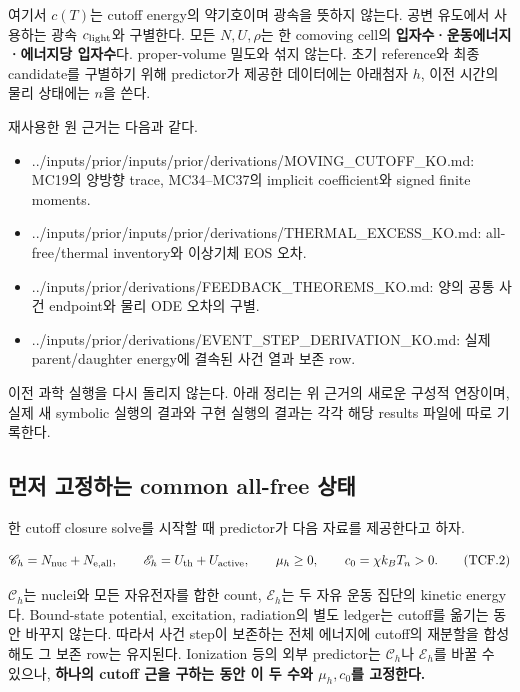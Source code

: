 \documentclass[11pt,a4paper]{article}
\providecommand{\tightlist}{\setlength{\itemsep}{2pt}\setlength{\parskip}{0pt}}
\begin{document}
여기서 \(c(T)\)는 cutoff energy의 약기호이며 광속을 뜻하지 않는다. 공변 유도에서 사용하는 광속 \(c_{\rm light}\)와 구별한다. 모든 \(N,U,\rho\)는 한 comoving cell의 \textbf{입자수·운동에너지·에너지당 입자수}다. proper-volume 밀도와 섞지 않는다. 초기 reference와 최종 candidate를 구별하기 위해 predictor가 제공한 데이터에는 아래첨자 \(h\), 이전 시간의 물리 상태에는 \(n\)을 쓴다.

재사용한 원 근거는 다음과 같다.

\begin{itemize}
\tightlist
\item
  ../inputs/prior/inputs/prior/derivations/MOVING\_CUTOFF\_KO.md: MC19의 양방향 trace, MC34--MC37의 implicit coefficient와 signed finite moments.
\item
  ../inputs/prior/inputs/prior/derivations/THERMAL\_EXCESS\_KO.md: all-free/thermal inventory와 이상기체 EOS 오차.
\item
  ../inputs/prior/derivations/FEEDBACK\_THEOREMS\_KO.md: 양의 공통 사건 endpoint와 물리 ODE 오차의 구별.
\item
  ../inputs/prior/derivations/EVENT\_STEP\_DERIVATION\_KO.md: 실제 parent/daughter energy에 결속된 사건 열과 보존 row.
\end{itemize}

이전 과학 실행을 다시 돌리지 않는다. 아래 정리는 위 근거의 새로운 구성적 연장이며, 실제 새 symbolic 실행의 결과와 구현 실행의 결과는 각각 해당 results 파일에 따로 기록한다.

\hypertarget{uxba3cuxc800-uxace0uxc815uxd558uxb294-common-all-free-uxc0c1uxd0dc}{%
\subsection{먼저 고정하는 common all-free 상태}\label{uxba3cuxc800-uxace0uxc815uxd558uxb294-common-all-free-uxc0c1uxd0dc}}

한 cutoff closure solve를 시작할 때 predictor가 다음 자료를 제공한다고 하자.

\[
\mathscr C_h=N_{\rm nuc}+N_{\rm e,all},\qquad
\mathscr E_h=U_{\rm th}+U_{\rm active},\qquad
\mu_h\ge0,\qquad c_0=\chi k_BT_n>0 .
\tag{TCF.2}
\]

\(\mathscr C_h\)는 nuclei와 모든 자유전자를 합한 count, \(\mathscr E_h\)는 두 자유 운동 집단의 kinetic energy다. Bound-state potential, excitation, radiation의 별도 ledger는 cutoff를 옮기는 동안 바꾸지 않는다. 따라서 사건 step이 보존하는 전체 에너지에 cutoff의 재분할을 합성해도 그 보존 row는 유지된다. Ionization 등의 외부 predictor는 \(\mathscr C_h\)나 \(\mathscr E_h\)를 바꿀 수 있으나, \textbf{하나의 cutoff 근을 구하는 동안 이 두 수와 \(\mu_h,c_0\)를 고정한다.}
\end{document}
